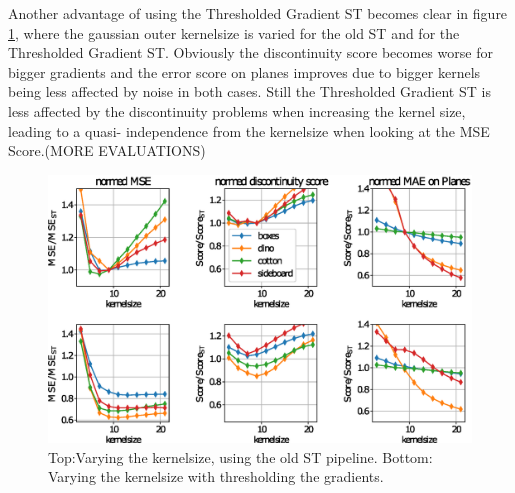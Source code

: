 \documentclass  [
  paper    = a4,
  BCOR     = 10mm,
  twoside,
  fontsize = 12pt,
  fleqn,
  toc      = bibnumbered,
  toc      = listofnumbered,
  numbers  = noendperiod,
  headings = normal,
  listof   = leveldown,
  version  = 3.03
]                                       {scrreprt}
\begin{document}
Another advantage of using the Thresholded Gradient ST becomes clear in figure \ref{fig:oldouter}, where the gaussian outer kernelsize is varied for the old ST and for the Thresholded Gradient ST. Obviously the discontinuity score becomes worse for bigger gradients and the error score on planes improves due to bigger kernels being less affected by noise in both cases. Still the Thresholded Gradient ST is less affected by the discontinuity problems when increasing the kernel size, leading to a quasi- independence from the kernelsize when looking at the MSE Score.(MORE EVALUATIONS)

\begin{figure}
	\centering
	\includegraphics[width=1\linewidth]{images/old_outer}
	\caption[Varying kernelsize]{Top:Varying the kernelsize, using the old ST pipeline. Bottom: Varying the kernelsize with thresholding the gradients.}
	\label{fig:oldouter}
\end{figure}
\end{document}
